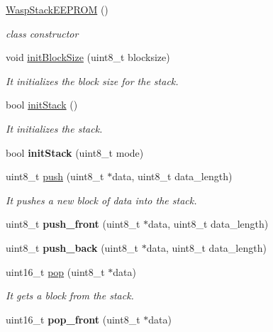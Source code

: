 \begin{DoxyCompactItemize}
\item 
\hyperlink{class_wasp_stack_e_e_p_r_o_m_a11b1a13e50f3906979f81ab490858ed1}{Wasp\+Stack\+E\+E\+P\+R\+OM} ()
\begin{DoxyCompactList}\small\item\em class constructor \end{DoxyCompactList}\item 
void \hyperlink{class_wasp_stack_e_e_p_r_o_m_aa350b0e8a9b11eb0644b9e00c506464c}{init\+Block\+Size} (uint8\+\_\+t blocksize)
\begin{DoxyCompactList}\small\item\em It initializes the block size for the stack. \end{DoxyCompactList}\item 
bool \hyperlink{class_wasp_stack_e_e_p_r_o_m_ab3679c6ed95bf08af180b22179cd6fef}{init\+Stack} ()
\begin{DoxyCompactList}\small\item\em It initializes the stack. \end{DoxyCompactList}\item 
bool {\bfseries init\+Stack} (uint8\+\_\+t mode)\hypertarget{class_wasp_stack_e_e_p_r_o_m_ad8ec52f0e0f3d18058af252e3d1b494f}{}\label{class_wasp_stack_e_e_p_r_o_m_ad8ec52f0e0f3d18058af252e3d1b494f}

\item 
uint8\+\_\+t \hyperlink{class_wasp_stack_e_e_p_r_o_m_ad20ab7a6f936a442882bc8c62ae7701c}{push} (uint8\+\_\+t $\ast$data, uint8\+\_\+t data\+\_\+length)
\begin{DoxyCompactList}\small\item\em It pushes a new block of data into the stack. \end{DoxyCompactList}\item 
uint8\+\_\+t {\bfseries push\+\_\+front} (uint8\+\_\+t $\ast$data, uint8\+\_\+t data\+\_\+length)\hypertarget{class_wasp_stack_e_e_p_r_o_m_a357a75cfddfb09b131470c04400af7a3}{}\label{class_wasp_stack_e_e_p_r_o_m_a357a75cfddfb09b131470c04400af7a3}

\item 
uint8\+\_\+t {\bfseries push\+\_\+back} (uint8\+\_\+t $\ast$data, uint8\+\_\+t data\+\_\+length)\hypertarget{class_wasp_stack_e_e_p_r_o_m_ad19ce1879f8f5a9d450be7e89452ea79}{}\label{class_wasp_stack_e_e_p_r_o_m_ad19ce1879f8f5a9d450be7e89452ea79}

\item 
uint16\+\_\+t \hyperlink{class_wasp_stack_e_e_p_r_o_m_a47861055ac9b04db93cae2fcc7341506}{pop} (uint8\+\_\+t $\ast$data)
\begin{DoxyCompactList}\small\item\em It gets a block from the stack. \end{DoxyCompactList}\item 
uint16\+\_\+t {\bfseries pop\+\_\+front} (uint8\+\_\+t $\ast$data)\hypertarget{class_wasp_stack_e_e_p_r_o_m_a5d14a59afbe8c0fd20014b488c058e3c}{}\label{class_wasp_stack_e_e_p_r_o_m_a5d14a59afbe8c0fd20014b488c058e3c}


\end{DoxyCompactItemize}
